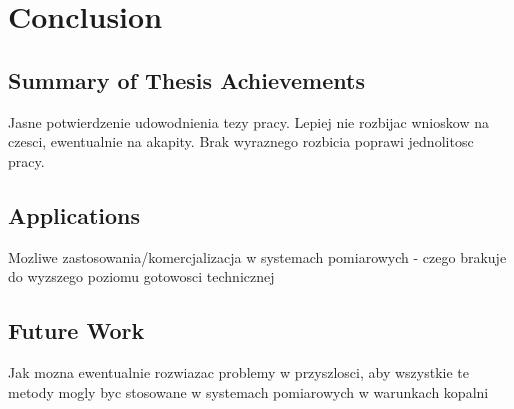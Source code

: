 \chapter{Conclusion}

\label{ch:conclusions}

\section{Summary of Thesis Achievements}

Jasne potwierdzenie udowodnienia tezy pracy. Lepiej nie rozbijac wnioskow na  czesci, ewentualnie na akapity. Brak wyraznego rozbicia poprawi jednolitosc pracy.


\section{Applications}

Mozliwe zastosowania/komercjalizacja w systemach pomiarowych - czego brakuje do wyzszego poziomu gotowosci technicznej

\section{Future Work}

Jak mozna ewentualnie rozwiazac problemy w przyszlosci, aby wszystkie te metody mogly byc stosowane w systemach pomiarowych w warunkach kopalni